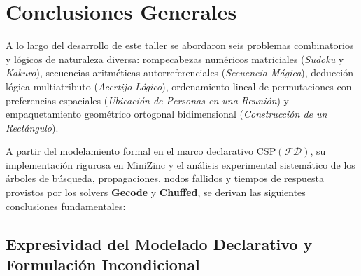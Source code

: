 \section{Conclusiones Generales}
\label{sec:conclusiones_generales}

A lo largo del desarrollo de este taller se abordaron seis problemas combinatorios y lógicos de naturaleza diversa: rompecabezas numéricos matriciales (\textit{Sudoku} y \textit{Kakuro}), secuencias aritméticas autorreferenciales (\textit{Secuencia Mágica}), deducción lógica multiatributo (\textit{Acertijo Lógico}), ordenamiento lineal de permutaciones con preferencias espaciales (\textit{Ubicación de Personas en una Reunión}) y empaquetamiento geométrico ortogonal bidimensional (\textit{Construcción de un Rectángulo}).

A partir del modelamiento formal en el marco declarativo $\text{CSP}(\mathcal{FD})$, su implementación rigurosa en MiniZinc y el análisis experimental sistemático de los árboles de búsqueda, propagaciones, nodos fallidos y tiempos de respuesta provistos por los solvers \textbf{Gecode} y \textbf{Chuffed}, se derivan las siguientes conclusiones fundamentales:

\subsection{Expresividad del Modelado Declarativo y Formulación Incondicional}

